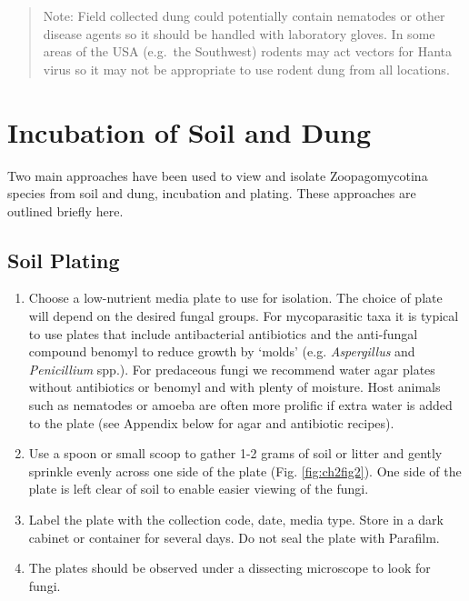 \documentclass[]{book}
\providecommand{\tightlist}{%
  \setlength{\itemsep}{0pt}\setlength{\parskip}{0pt}}
\begin{document}
\begin{quote}
Note: Field collected dung could potentially contain nematodes or other
disease agents so it should be handled with laboratory gloves. In some
areas of the USA (e.g.~the Southwest) rodents may act vectors for Hanta
virus so it may not be appropriate to use rodent dung from all
locations.
\end{quote}

\section{Incubation of Soil and Dung}\label{incubation-of-soil-and-dung}

Two main approaches have been used to view and isolate Zoopagomycotina
species from soil and dung, incubation and plating. These approaches are
outlined briefly here.

\subsection{Soil Plating}\label{soil-plating}

\begin{enumerate}
\def\labelenumi{\arabic{enumi}.}
\tightlist
\item
  Choose a low-nutrient media plate to use for isolation. The choice of
  plate will depend on the desired fungal groups. For mycoparasitic taxa
  it is typical to use plates that include antibacterial antibiotics and
  the anti-fungal compound benomyl to reduce growth by `molds' (e.g.
  \emph{Aspergillus} and \emph{Penicillium} spp.). For predaceous fungi
  we recommend water agar plates without antibiotics or benomyl and with
  plenty of moisture. Host animals such as nematodes or amoeba are often
  more prolific if extra water is added to the plate (see Appendix below
  for agar and antibiotic recipes).
\item
  Use a spoon or small scoop to gather 1-2 grams of soil or litter and
  gently sprinkle evenly across one side of the plate (Fig.
  \ref{fig:ch2fig2}). One side of the plate is left clear of soil to
  enable easier viewing of the fungi.
\item
  Label the plate with the collection code, date, media type. Store in a
  dark cabinet or container for several days. Do {not} seal the plate
  with Parafilm.
\item
  The plates should be observed under a dissecting microscope to look
  for fungi.
\end{enumerate}
\end{document}
